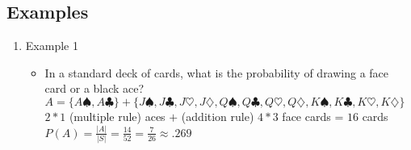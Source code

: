 \documentclass[12pt]{article}
\begin{document}
        \subsection{Examples}
            \begin{enumerate}
                \item Example 1
                \begin{itemize}
                    \item In a standard deck of cards, what is the probability of drawing a face card or a black ace?
                    \\$A = \{A\spadesuit, A\clubsuit\} + \{J\spadesuit, J\clubsuit, J\heartsuit, J\diamondsuit, Q\spadesuit, Q\clubsuit, Q\heartsuit, Q\diamondsuit, K\spadesuit, K\clubsuit, K\heartsuit, K\diamondsuit\}$
                    \\$2 * 1$ (multiple rule) aces $+$ (addition rule) $4 * 3$ face cards = $16$ cards
                    \\$P(A) = \frac{|A|}{|S|} = \frac{14}{52} = \frac{7}{26} \approx .269$
                \end{itemize}
            \end{enumerate}
\end{document}
